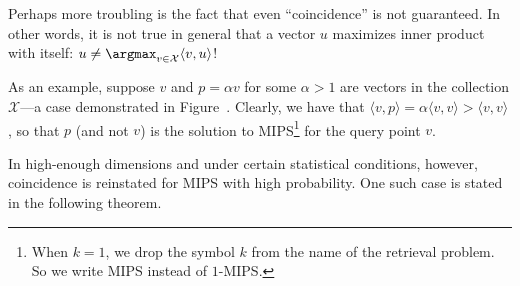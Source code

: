 \begin{svgraybox}
Perhaps more troubling is the fact that even ``coincidence'' is not guaranteed.
In other words, it is not true in general that a vector $u$ maximizes
inner product with itself: $u \neq \argmax_{v \in \mathcal{X}} \langle v, u \rangle$!
\end{svgraybox}

As an example, suppose $v$ and $p = \alpha v$ for some $\alpha > 1$ are vectors
in the collection $\mathcal{X}$---a case demonstrated in Figure~.
Clearly, we have that $\langle v, p \rangle = \alpha \langle v, v \rangle > \langle v, v \rangle$,
so that $p$ (and not $v$) is the solution to MIPS\footnote{When $k=1$, we drop the symbol $k$ from the name of the retrieval problem. So we write MIPS instead of $1$-MIPS.}
for the query point $v$.

In high-enough dimensions and under certain statistical conditions, however,
coincidence is reinstated for MIPS with high probability. One such case is stated in the 
following theorem.

